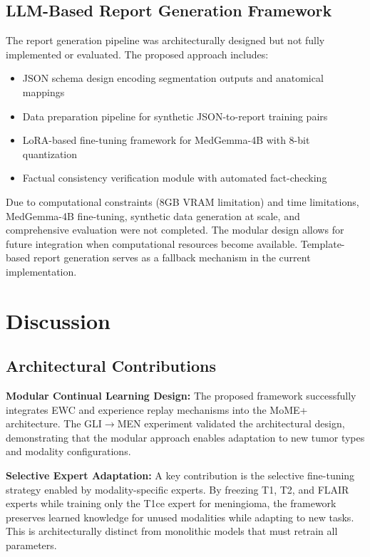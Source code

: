 \documentclass[conference]{IEEEtran}
\begin{document}
\subsection{LLM-Based Report Generation Framework}

The report generation pipeline was architecturally designed but not fully implemented or evaluated. The proposed approach includes:

\begin{itemize}
\item JSON schema design encoding segmentation outputs and anatomical mappings
\item Data preparation pipeline for synthetic JSON-to-report training pairs
\item LoRA-based fine-tuning framework for MedGemma-4B with 8-bit quantization
\item Factual consistency verification module with automated fact-checking
\end{itemize}

Due to computational constraints (8GB VRAM limitation) and time limitations, MedGemma-4B fine-tuning, synthetic data generation at scale, and comprehensive evaluation were not completed. The modular design allows for future integration when computational resources become available. Template-based report generation serves as a fallback mechanism in the current implementation.



\section{Discussion}

\subsection{Architectural Contributions}

\textbf{Modular Continual Learning Design:} The proposed framework successfully integrates EWC and experience replay mechanisms into the MoME+ architecture. The GLI$\to$MEN experiment validated the architectural design, demonstrating that the modular approach enables adaptation to new tumor types and modality configurations.

\textbf{Selective Expert Adaptation:} A key contribution is the selective fine-tuning strategy enabled by modality-specific experts. By freezing T1, T2, and FLAIR experts while training only the T1ce expert for meningioma, the framework preserves learned knowledge for unused modalities while adapting to new tasks. This is architecturally distinct from monolithic models that must retrain all parameters.
\end{document}
